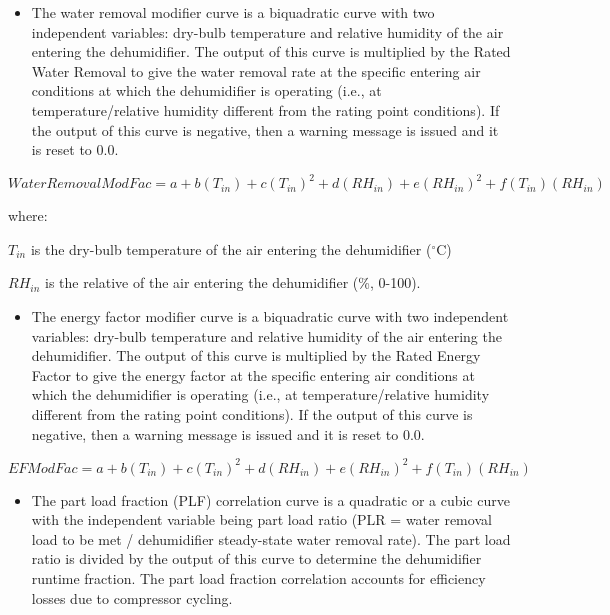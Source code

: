 \begin{itemize}
\item The water removal modifier curve is a biquadratic curve with two independent variables: dry-bulb temperature and relative humidity of the air entering the dehumidifier. The output of this curve is multiplied by the Rated Water Removal to give the water removal rate at the specific entering air conditions at which the dehumidifier is operating (i.e., at temperature/relative humidity different from the rating point conditions). If the output of this curve is negative, then a warning message is issued and it is reset to 0.0.
\end{itemize}

\begin{equation}
WaterRemovalModFac = a + b\left( {{T_{in}}} \right) + c{\left( {{T_{in}}} \right)^2} + d\left( {R{H_{in}}} \right) + e{(R{H_{in}})^2} + f({T_{in}})(R{H_{in}})
\end{equation}

where:

\(T_{in}\) is the dry-bulb temperature of the air entering the dehumidifier (\(^{\circ}\)C)

\(RH_{in}\) is the relative of the air entering the dehumidifier (\%, 0-100).

\begin{itemize}
\item The energy factor modifier curve is a biquadratic curve with two independent variables: dry-bulb temperature and relative humidity of the air entering the dehumidifier. The output of this curve is multiplied by the Rated Energy Factor to give the energy factor at the specific entering air conditions at which the dehumidifier is operating (i.e., at temperature/relative humidity different from the rating point conditions). If the output of this curve is negative, then a warning message is issued and it is reset to 0.0.
\end{itemize}

\begin{equation}
EFModFac = a + b\left( {{T_{in}}} \right) + c{\left( {{T_{in}}} \right)^2} + d\left( {R{H_{in}}} \right) + e{(R{H_{in}})^2} + f({T_{in}})(R{H_{in}})
\end{equation}

\begin{itemize}
\item The part load fraction (PLF) correlation curve is a quadratic or a cubic curve with the independent variable being part load ratio (PLR = water removal load to be met / dehumidifier steady-state water removal rate). The part load ratio is divided by the output of this curve to determine the dehumidifier runtime fraction. The part load fraction correlation accounts for efficiency losses due to compressor cycling.
\end{itemize}

